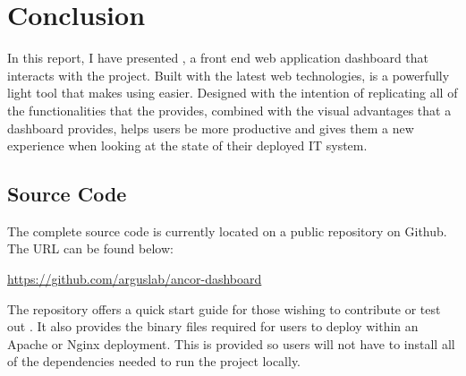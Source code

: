
\cleardoublepage

\chapter{Conclusion}
\label{makereference5}

In this report, I have presented \projectName{}, a front end web application dashboard that interacts with the \ancor{} project. Built with the latest web technologies, \projectName{} is a powerfully light tool that makes using \ancor{} easier. Designed with the intention of replicating all of the functionalities that the \ancorcli{} provides, combined with the visual advantages that a dashboard provides, \projectName{} helps \ancor{} users be more productive and gives them a new experience when looking at the state of their deployed IT system.

\section{Source Code}
\label{makereference5.1}

The complete source code is currently located on a public repository on Github. The URL can be found below:

\begin{list}{-}{}
\item \url{https://github.com/arguslab/ancor-dashboard}
\end{list}

The repository offers a quick start guide for those wishing to contribute or test out \projectName{}. It also provides the binary files required for users to deploy within an Apache or Nginx deployment. This is provided so users will not have to install all of the dependencies needed to run the project locally.
